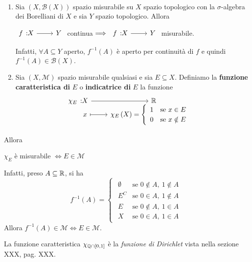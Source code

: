 \begin{examples}~{}
	\begin{enumerate}
		\item Sia $\left(X,\mathcal{B}\left(X\right)\right)$ spazio misurabile su $X$ spazio topologico con la $\sigma$-algebra dei Borelliani di $X$ e sia $Y$ spazio topologico. Allora
		\begin{center}
			$\funz{f}{X}{Y}$ continua$\implies \funz{f}{X}{Y}$ misurabile.
		\end{center}
	Infatti, $\forall A\subseteq Y$ aperto, $f^{-1}\left(A\right)$ è aperto per continuità di $f$ e quindi $f^{-1}\left(A\right)\in\mathcal{B}\left(X\right)$.
	\item Sia $\left(X,\mathcal{M}\right)$ spazio misurabile qualsiasi e sia $E\subseteq X$. Definiamo la \textbf{funzione caratteristica di} $E$ o \textbf{indicatrice di} $E$ la funzione
	\begin{equation}
		\funztot{\chi_E}{X}{\realset}{x}{\chi_E\left(X\right)=\begin{cases}
				\begin{array}{ll}
					1&\text{se }x\in E\\
					0&\text{se }x\notin E\\
				\end{array}
		\end{cases}}
	\end{equation}
	\end{enumerate}
	Allora
	\begin{center}
		$\chi_E$ è misurabile $\iff E\in\mathcal{M}$
	\end{center}
Infatti, preso $A\subseteq \mathbb{R}$, si ha
\begin{equation*}
	f^{-1}\left(A\right)=\begin{cases}
		\begin{array}{ll}
			\emptyset&\text{se }0\notin A,\ 1\notin A\\
			E^C&\text{se }0\in A,\ 1\notin A\\
			E&\text{se }0\notin A,\ 1\in A\\
			X&\text{se }0\in A,\ 1\in A
		\end{array}
	\end{cases}
\end{equation*}
Allora $f^{-1}\left(A\right)\in\mathcal{M}\iff E\in\mathcal{M}$.
\end{examples}
\begin{observe}
	La funzione caratteristica $\chi_{\mathbb{Q}\cap\left[0,1\right]}$ è la \textit{funzione di Dirichlet} vista nella sezione XXX, pag. XXX. %
\end{observe}
